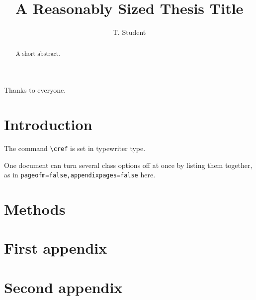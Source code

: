 \documentclass[phd,appendixpages=false,12pt,a4paper]{bangorthesis}
\title{A Reasonably Sized Thesis Title}
\author{T. Student}
\begin{document}
\maketitle
\begin{acknowledgements}
  Thanks to everyone.
\end{acknowledgements}
\begin{abstract}
  A short abstract.
\end{abstract}
\tableofcontents
\chapter{Introduction}
The command \texttt{\textbackslash cref} is set in typewriter type.

One document can turn several class options off at once by listing them together, as in \texttt{pageofm=false,appendixpages=false} here.
\chapter{Methods}
\appendix
\chapter{First appendix}
\chapter{Second appendix}
\end{document}
